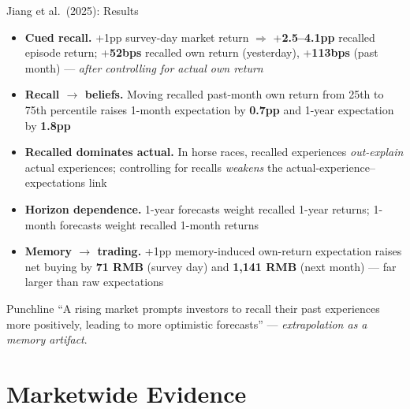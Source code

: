\documentclass[aspectratio=169, 11pt]{beamer}
\begin{document}
\begin{frame}[shrink=5]{Jiang et al.\ (2025): Results}
\begin{itemize}
\item \textbf{Cued recall.} +1pp survey-day market return $\Rightarrow$ +\textbf{2.5--4.1pp} recalled episode return; +\textbf{52bps} recalled own return (yesterday), +\textbf{113bps} (past month) --- \emph{after controlling for actual own return}
\item \textbf{Recall $\to$ beliefs.} Moving recalled past-month own return from 25th to 75th percentile raises 1-month expectation by \textbf{0.7pp} and 1-year expectation by \textbf{1.8pp}
\item \textbf{Recalled dominates actual.} In horse races, recalled experiences \emph{out-explain} actual experiences; controlling for recalls \emph{weakens} the actual-experience--expectations link
\item \textbf{Horizon dependence.} 1-year forecasts weight recalled 1-year returns; 1-month forecasts weight recalled 1-month returns
\item \textbf{Memory $\to$ trading.} +1pp memory-induced own-return expectation raises net buying by \textbf{71 RMB} (survey day) and \textbf{1,141 RMB} (next month) --- far larger than raw expectations
\end{itemize}
\vfill
\begin{block}{Punchline}
``A rising market prompts investors to recall their past experiences more positively, leading to more optimistic forecasts'' --- \emph{extrapolation as a memory artifact}.
\end{block}
\end{frame}

\section{Marketwide Evidence}
\end{document}
